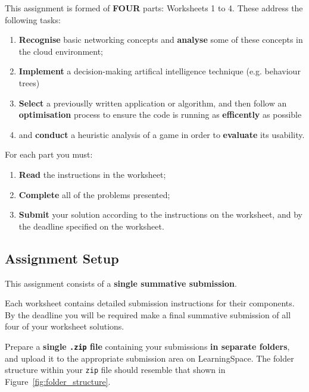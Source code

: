 \documentclass{../../fal_assignment}
\begin{document}
This assignment is formed of \textbf{FOUR} parts: Worksheets 1 to 4. These address the following tasks:

\begin{enumerate}
  \item \textbf{Recognise} basic networking concepts and \textbf{analyse} some of these concepts in the cloud environment;
  \item \textbf{Implement} a decision-making artifical intelligence technique (e.g. behaviour trees)
  \item \textbf{Select} a previouslly written application or algorithm, and then follow an \textbf{optimisation} process to ensure the code is running as \textbf{efficently} as possible
  \item and \textbf{conduct} a heuristic analysis of a game in order to \textbf{evaluate} its usability.
\end{enumerate}

For each part you must:

\begin{enumerate}[label=(\roman*)]
    \item \textbf{Read} the instructions in the worksheet;
    \item \textbf{Complete} all of the problems presented;
    \item \textbf{Submit} your solution according to the instructions on the worksheet, and by the deadline specified on the worksheet.
\end{enumerate}

\subsection*{Assignment Setup} 

This assignment consists of a \textbf{single summative submission}.

Each worksheet contains detailed submission instructions for their components. By the deadline you will be required make a final summative submission of all four of your worksheet solutions.

Prepare a \textbf{single \texttt{.zip} file} containing your submissions \textbf{in separate folders}, and upload it to the appropriate submission area on LearningSpace. The folder structure within your \texttt{zip} file should resemble that shown in Figure~\ref{fig:folder_structure}.
\end{document}
